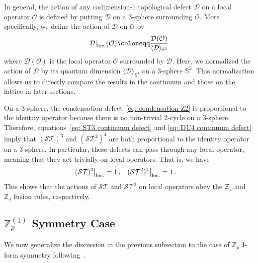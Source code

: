 \documentclass[aps,twocolumn,prx,floatfix,preprintnumbers, nofootinbib,10pt]{revtex4-2}
\numberwithin{equation}{section}
\theoremstyle{definition}
\theoremstyle{remark}
\theoremstyle{claim}
\newcommand{\be}{\begin{equation}}
\newcommand{\ee}{\end{equation}}
\newcommand{\Z}{{\mathbb Z}}
\newcommand{\mc}[1]{\mathcal{#1}}
\newcommand\restr[2]{{%
  \left.\kern-\nulldelimiterspace %
  #1 %
  \right|_{#2} %
}}
\newcommand{\opaction}[1]{\restr{#1}{\text{loc.}}}
\begin{document}
In general, the action of any codimension-1 topological defect $\mathcal{D}$ on a local operator $\mathcal{O}$ is defined by putting $\mathcal{D}$ on a 3-sphere surrounding $\mathcal{O}$.
More specifically, we define the action of $\mathcal{D}$ on $\mathcal{O}$ by
\be\label{eq: defect action}
\opaction{\mc{D}}(\mc{O}) \coloneqq \frac{\mc{D}(\mc{O})}{\langle \mc{D} \rangle_{\mathbb{S}^3}}
\ee
where $\mathcal{D}(\mathcal{O})$ is the local operator $\mathcal{O}$ surrounded by $\mathcal{D}$.
Here, we normalized the action of $\mathcal{D}$ by its quantum dimension $\langle \mathcal{D} \rangle_{\mathbb{S}^3}$ on a 3-sphere $\mathbb{S}^3$.
This normalization allows us to directly compare the results in the continuum and those on the lattice in later sections.

On a 3-sphere, the condensation defect~\eqref{eq: condensation Z2} is proportional to the identity operator because there is no non-trivial 2-cycle on a 3-sphere.
Therefore, equations~\eqref{eq: ST3 continuum defect} and \eqref{eq: DU4 continuum defect} imply that $(\mathcal{ST})^3$ and $(\mathcal{S}\mathcal{T}^2)^4$ are both proportional to the identity operator on a 3-sphere.
In particular, these defects can pass through any local operator, meaning that they act trivially on local operators.
That is, we have
\begin{align}
 \opaction{(\mc{ST})^3} &= 1 \,, & \opaction{(\mc{ST}^2)^4} &= 1 \,.
\end{align}
This shows that the actions of $\mathcal{ST}$ and $\mathcal{S}\mathcal{T}^2$ on local operators obey the $\mathbb{Z}_3$ and $\mathbb{Z}_4$ fusion rules, respectively.



\subsection{$\Z_p^{(1)}$ Symmetry Case}
\label{sec: continuum fusion rules Zp}
We now generalize the discussion in the previous subsection to the case of $\mathbb{Z}_p$ 1-form symmetry following~\cite{Choi:2022zal}.
\end{document}
